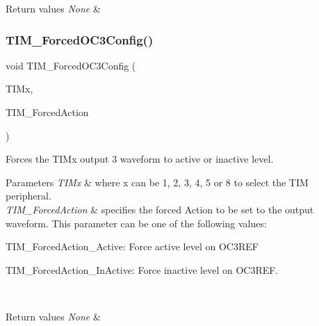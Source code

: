 \begin{DoxyRetVals}{Return values}
{\em None} & \\
\hline
\end{DoxyRetVals}
\mbox{\label{group___t_i_m___exported___functions_ga920b0fb4ca44fceffd1c3e441feebd8f}} 
\subsubsection{\texorpdfstring{TIM\_ForcedOC3Config()}{TIM\_ForcedOC3Config()}}
{\footnotesize\ttfamily void T\+I\+M\+\_\+\+Forced\+O\+C3\+Config (\begin{DoxyParamCaption}\item[{\mbox{\hyperlink{struct_t_i_m___type_def}{T\+I\+M\+\_\+\+Type\+Def}} $\ast$}]{T\+I\+Mx,  }\item[{uint16\+\_\+t}]{T\+I\+M\+\_\+\+Forced\+Action }\end{DoxyParamCaption})}



Forces the T\+I\+Mx output 3 waveform to active or inactive level. 


\begin{DoxyParams}{Parameters}
{\em T\+I\+Mx} & where x can be 1, 2, 3, 4, 5 or 8 to select the T\+IM peripheral. \\
\hline
{\em T\+I\+M\+\_\+\+Forced\+Action} & specifies the forced Action to be set to the output waveform. This parameter can be one of the following values\+: \begin{DoxyItemize}
\item T\+I\+M\+\_\+\+Forced\+Action\+\_\+\+Active\+: Force active level on O\+C3\+R\+EF \item T\+I\+M\+\_\+\+Forced\+Action\+\_\+\+In\+Active\+: Force inactive level on O\+C3\+R\+EF. \end{DoxyItemize}
\\
\hline
\end{DoxyParams}

\begin{DoxyRetVals}{Return values}
{\em None} & \\
\hline
\end{DoxyRetVals}
\mbox{\label{group___t_i_m___exported___functions_gaf0a0bbe74251e56d4b835d20b0a3aa63}} 
